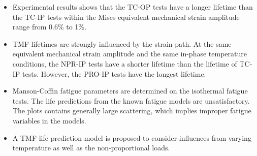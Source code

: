 \begin{itemize}
\item Experimental results shows that the TC-OP tests have a longer lifetime than the TC-IP tests within the Mises equivalent mechanical strain amplitude range from 0.6\% to 1\%.

\item TMF lifetimes are strongly influenced by the strain path. At the same equivalent mechanical strain amplitude and the same in-phase temperature conditions, the NPR-IP tests have a shorter lifetime than the lifetime of TC-IP tests. However, the PRO-IP tests have the longest lifetime.

\item Manson-Coffin fatigue parameters are determined on the isothermal fatigue tests. The life predictions from the known fatigue models are unsatisfactory. The plots contains generally large scattering, which implies improper fatigue variables in the models.

\item A TMF life prediction model is proposed to consider influences from varying temperature as well as the non-proportional loads.
\end{itemize}
